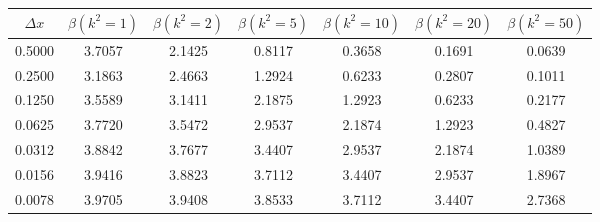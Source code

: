 \begin{tabular}{|c|c|c|c|c|c|c|}
\hline
\textbf{$\Delta x$}&\textbf{$\beta(k^2=1)$}&\textbf{$\beta(k^2=2)$}&\textbf{$\beta(k^2=5)$}&\textbf{$\beta(k^2=10)$}&\textbf{$\beta(k^2=20)$}&\textbf{$\beta(k^2=50)$}\\\hline
0.5000&3.7057&2.1425&0.8117&0.3658&0.1691&0.0639\\\hline
0.2500&3.1863&2.4663&1.2924&0.6233&0.2807&0.1011\\\hline
0.1250&3.5589&3.1411&2.1875&1.2923&0.6233&0.2177\\\hline
0.0625&3.7720&3.5472&2.9537&2.1874&1.2923&0.4827\\\hline
0.0312&3.8842&3.7677&3.4407&2.9537&2.1874&1.0389\\\hline
0.0156&3.9416&3.8823&3.7112&3.4407&2.9537&1.8967\\\hline
0.0078&3.9705&3.9408&3.8533&3.7112&3.4407&2.7368\\\hline
\end{tabular}
